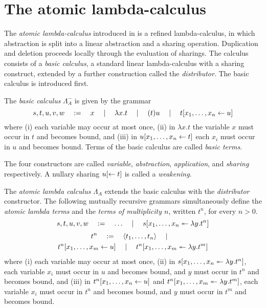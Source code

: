\documentclass{llncs} %
\begin{document}
\section{The atomic lambda-calculus}
\label{sec:introduction}


The \emph{atomic lambda-calculus} introduced in \cite{Gundersen-Heijltjes-Parigot-2013-LICS} is a refined lambda-calculus, in which abstraction is split into a linear abstraction and a sharing operation.
%
Duplication and deletion proceeds locally through the evaluation of sharings.
%
The calculus consists of a \emph{basic calculus}, a standard linear lambda-calculus with a sharing construct, extended by a further construction called the \emph{distributor}.
%
The basic calculus is introduced first.


\begin{definition}
The \emph{basic calculus} $\Lambda_A^-$ is given by the grammar
%
\[
s,t,u,v,w  \quad\coloneq\quad x
	\mmid	\lambda x.t 
	\mmid	(t)u
	\mmid	t\share xu
\]
%
where 
(i) each variable may occur at most once, 
(ii) in $\lambda x.t$ the variable $x$ must occur in $t$ and becomes bound, and
(iii) in $u\share xt$ each $x_i$ must occur in $u$ and becomes bound.
%
Terms of the basic calculus are called \emph{basic terms}.
\end{definition}
%
%
%
The four constructors are called \emph{variable}, \emph{abstraction}, \emph{application}, and \emph{sharing} respectively.
%
A nullary sharing $u\share*{}t$ is called a \emph{weakening}.



\begin{definition}
The \emph{atomic lambda calculus} $\Lambda_A$ extends the basic calculus with the \emph{distributor} constructor.
%
The following mutually recursive grammars simultaneously define the \emph{atomic lambda terms} and the \emph{terms of multiplicity $n$}, written $t^n$, for every $n>0$. 
%
\[
	s,t,u,v,w  \quad\coloneq\quad \ldots \mmid s\distr xy{t^n}
\]
\begin{multline*}
	t^n \quad\coloneq\quad \tup t\mmid \\
	t^n\share[m]xu \mmid t^n\distr[m]xy{t^m}
\end{multline*}
%
where 
(i) each variable may occur at most once, 
(ii) in $s\distr xy{t^n}$, each variable $x_i$ must occur in $u$ and becomes bound, and $y$ must occur in $t^n$ and becomes bound, and 
(iii) in $t^n\share xu$ and $t^n\distr[m]xy{t^m}$, each variable $x_i$ must occur in $t^n$ and becomes bound, and $y$ must occur in $t^m$ and becomes bound.

\end{definition}
\end{document}

